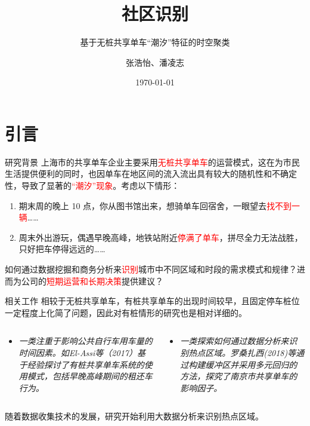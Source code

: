 \documentclass[11pt,aspectratio=149]{ctexbeamer}
\title{社区识别}
\subtitle{基于无桩共享单车“潮汐”特征的时空聚类}
\author{张浩怡、潘凌志}
\date{\today}
\newcommand{\textred}[1]{\textcolor{red}{#1}}
\begin{document}
\begin{frame}
    \maketitle
\end{frame}


\begin{frame}[plain]
\tableofcontents
\end{frame}

\section{引言}


\begin{frame}{研究背景}
上海市的共享单车企业主要采用\textred{无桩共享单车}的运营模式，这在为市民生活提供便利的同时，也因单车在地区间的流入流出具有较大的随机性和不确定性，导致了显著的\textred{“潮汐”现象}。考虑以下情形：
\begin{enumerate}
\item 期末周的晚上 10 点，你从图书馆出来，想骑单车回宿舍，一眼望去\textred{找不到一辆}……
\item 周末外出游玩，偶遇早晚高峰，地铁站附近\textred{停满了单车}，拼尽全力无法战胜，只好把车停得远远的……
\end{enumerate}

如何通过数据挖掘和商务分析来\textred{识别}城市中不同区域和时段的需求模式和规律？进而为公司的\textred{短期运营和长期决策}提供建议？
\end{frame}

\begin{frame}{相关工作}
相较于无桩共享单车，有桩共享单车的出现时间较早，且固定停车桩位一定程度上化简了问题，因此对有桩情形的研究也是相对详细的。
\begin{columns}[T]
\begin{column}{0.48\textwidth}
\begin{itemize}
    \item \textit{一类注重于影响公共自行车用车量的时间因素。如El-Assi等（2017）基于经验探讨了有桩共享单车系统的使用模式，包括早晚高峰期间的租还车行为。}
\end{itemize}

\end{column}
\begin{column}{0.48\textwidth} 
\begin{itemize}
    \item \textit{一类探索如何通过数据分析来识别热点区域。罗桑扎西(2018)等通过构建缓冲区并采用多元回归的方法，探究了南京市共享单车的影响因子。}
\end{itemize}
\end{column}
\end{columns}
 \vspace{0.5cm} %
随着数据收集技术的发展，研究开始利用大数据分析来识别热点区域。
\end{frame}
\end{document}
